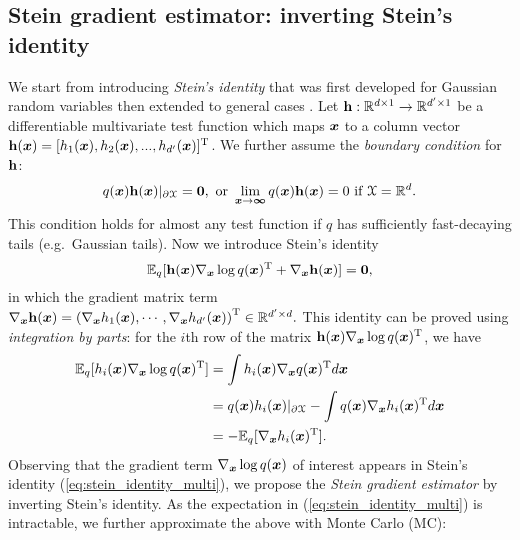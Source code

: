 \subsection{Stein gradient estimator: inverting Stein's identity}
We start from introducing \emph{Stein's identity} that was first developed for Gaussian random variables \citep{stein:stein_method1972, stein:stein_method_multi1981} then extended to general cases \citep{gorham:stein_method2015, liu:ksd2016}.
%
Let $\mathbf{h}: \mathbb{R}^{d \times 1} \rightarrow \mathbb{R}^{d' \times 1}$ be a differentiable multivariate test function which maps $\bm{x}$ to a column vector $\mathbf{h}(\bm{x}) = [h_1(\bm{x}), h_2(\bm{x}), ..., h_{d'}(\bm{x})]^{\text{T}}$. We further assume the \emph{boundary condition} for $\mathbf{h}$: 
\begin{equation}
q(\bm{x})\mathbf{h}(\bm{x}) |_{\partial \mathcal{X}} = \bm{0}, \text{ or } \lim_{\bm{x} \rightarrow \bm{\infty}} q(\bm{x}) \mathbf{h}(\bm{x}) = 0 \text{ if } \mathcal{X} = \mathbb{R}^d.
\label{eq:boundary_condition}
\end{equation}
This condition holds for almost any test function if $q$ has sufficiently fast-decaying tails (e.g.~Gaussian tails).
%
Now we introduce Stein's identity \citep{stein:stein_method_multi1981, gorham:stein_method2015, liu:ksd2016}
\begin{equation}
\mathbb{E}_{q}[\mathbf{h}(\bm{x}) \nabla_{\bm{x}} \log q(\bm{x})^{\text{T}} + \nabla_{\bm{x}} \mathbf{h}(\bm{x}) ] = \bm{0}, 
\label{eq:stein_identity_multi}
\end{equation}
in which the gradient matrix term
$
\nabla_{\bm{x}} \mathbf{h}(\bm{x}) = \left( \nabla_{\bm{x}} h_1(\bm{x}), \cdots, \nabla_{\bm{x}} h_{d'}(\bm{x}) \right)^{\text{T}} \in \mathbb{R}^{d' \times d}.
$
This identity can be proved using \emph{integration by parts}: for the $i$th row of the matrix $\mathbf{h}(\bm{x}) \nabla_{\bm{x}} \log q(\bm{x})^{\text{T}}$, we have
\begin{equation}
\begin{aligned}
\mathbb{E}_{q}[ h_i(\bm{x}) \nabla_{\bm{x}} \log q(\bm{x})^{\text{T}}]
&= \int h_i(\bm{x}) \nabla_{\bm{x}} q(\bm{x})^{\text{T}} d \bm{x} \\
&= q(\bm{x})h_i(\bm{x}) |_{\partial \mathcal{X}} - \int q(\bm{x})  \nabla_{\bm{x}} h_i(\bm{x})^{\text{T}} d \bm{x} \\
&= - \mathbb{E}_{q} [\nabla_{\bm{x}} h_i(\bm{x})^{\text{T}}].
\end{aligned}
\label{eq:integration_by_parts}
\end{equation}
Observing that the gradient term $\nabla_{\bm{x}} \log q(\bm{x})$ of interest appears in Stein's identity (\ref{eq:stein_identity_multi}), we propose the \emph{Stein gradient estimator} by inverting Stein's identity. As the expectation in (\ref{eq:stein_identity_multi}) is intractable, we further approximate the above with Monte Carlo (MC):
